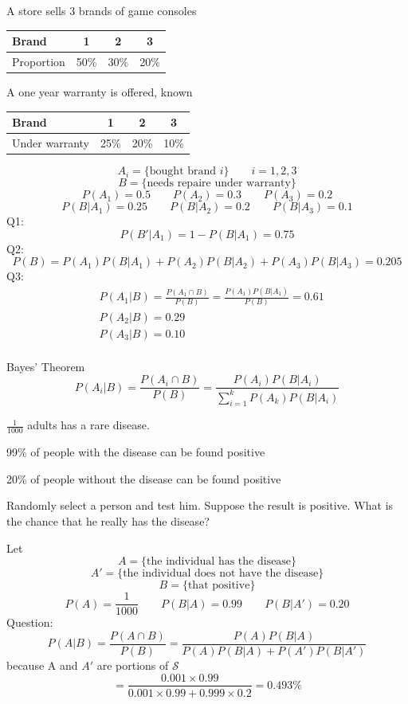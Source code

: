 \begin{exmp}
  A store sells 3 brands of game consoles

  \vspace{4mm}
\begin{center}
  \begin{tabular}{l|ccc}
    \hline
    Brand & 1 & 2 & 3 \\
    \hline
    Proportion & 50\% & 30\% & 20\%\\
    \hline
  \end{tabular}  
\end{center}


A one year warranty is offered, known 

\begin{center}
    \begin{tabular}{l|ccc}
    \hline
    Brand & 1 & 2 & 3 \\
    \hline
    Under warranty & 25\% & 20\% & 10\%\\
    \hline
  \end{tabular}
\end{center}
  \[A_i=\{\text{bought brand }i\} \qquad i=1,2,3\]
  \[B=\{\text{needs repaire under warranty}\} \]
  \[P(A_1)=0.5 \qquad P(A_2)=0.3 \qquad P(A_3)=0.2\]
  \[P(B|A_1)=0.25 \qquad P(B|A_2)=0.2 \qquad P(B|A_3)=0.1\]
  Q1:\[P(B'|A_1)=1-P(B|A_1)=0.75\]
  Q2:\[P(B)=P(A_1)P(B|A_1)+P(A_2)P(B|A_2)+P(A_3)P(B|A_3)=0.205\]
  Q3:\begin{align*}
  &P(A_1|B)=\frac{P(A_1 \cap B)}{P(B)}=\frac{P(A_1)P(B|A_1)}{P(B)}=0.61\\
  &P(A_2|B)=0.29 \\
  &P(A_3|B)=0.10\\
  \end{align*}
\end{exmp}

\begin{theo}
  Bayes' Theorem
  \[P(A_i|B)=\frac{P(A_i \cap B)}{P(B)}=\frac{P(A_i)P(B|A_i)}{\sum_{i=1}^k P(A_k)P(B|A_i)}    \]
\end{theo}

\begin{exmp}
$\frac{1}{1000}$ adults has a rare disease.

99\% of people with the disease can be found positive

20\% of people without the disease can be found positive

Randomly select a person and test him. Suppose the result is positive. What is the chance that he really has the disease? 

Let
\[	A=\{\text{the individual has the disease} \}		\]
\[	A'=\{\text{the individual does not have the disease} \}		\]
\[	B=\{\text{that positive} \}		\]
\[	P(A)=\frac{1}{1000} \qquad P(B|A)=0.99 \qquad P(B|A')=0.20	\]
Question:
\[	P(A|B)=\frac{P(A \cap B)}{P(B)}=\frac{P(A)P(B|A)}{P(A)P(B|A)+P(A')P(B|A')}		\]
because A and $A'$ are portions of $\mathcal{S}$
\[	=\frac{0.001\times 0.99}{0.001\times 0.99+ 0.999\times 0.2}=0.493\%		\]
\end{exmp}

